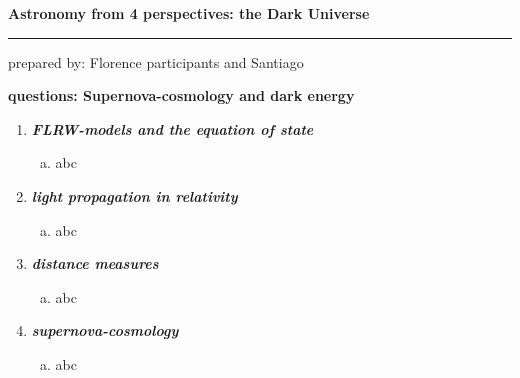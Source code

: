 \documentclass[a4paper,12pt]{article}
\newcommand{\question}[1]{\textbf{\textit{#1}}}
\newcommand{\HRule}{\rule{\linewidth}{0.3mm}}
\begin{document}
\pagestyle{empty}

\begin{center}
\LARGE \textbf{Astronomy from 4 perspectives: the Dark Universe}
\HRule
\end{center}
\begin{flushright}
prepared by: Florence participants  and Santiago
\end{flushright}
\begin{center}
{\Large \textbf{questions: Supernova-cosmology and dark energy}}
\end{center}
\vspace{5mm}

\begin{enumerate}

\item \question{FLRW-models and the equation of state}\\
\begin{enumerate}[(a)]
\item{abc}
\end{enumerate}

\item \question{light propagation in relativity}\\
\begin{enumerate}[(a)]
\item{abc}
\end{enumerate}

\item \question{distance measures}\\
\begin{enumerate}[(a)]
\item{abc}
\end{enumerate}

\item \question{supernova-cosmology}\\
\begin{enumerate}[(a)]
\item{abc}
\end{enumerate}


\end{enumerate}
\end{document}
